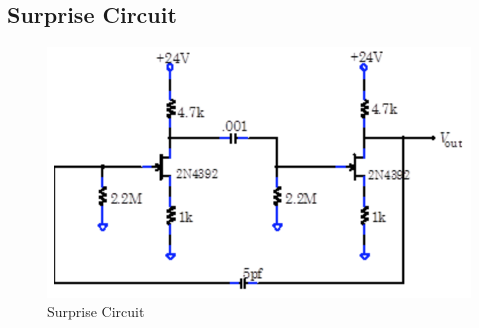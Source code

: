 \documentclass{article}
\begin{document}
\subsection{Surprise Circuit}
    \begin{figure}[H]
        \centering
        \includegraphics[scale = 0.7]{5_11.png}
        \caption{Surprise Circuit~\cite{webfig}}
        \label{fig:my_label}
    \end{figure}
\end{document}
